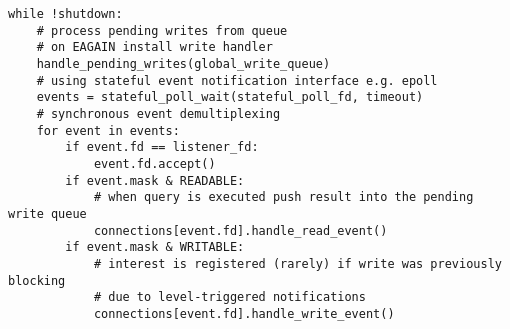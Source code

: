 \begin{lstlisting}
while !shutdown:
    # process pending writes from queue
    # on EAGAIN install write handler
    handle_pending_writes(global_write_queue)
    # using stateful event notification interface e.g. epoll
    events = stateful_poll_wait(stateful_poll_fd, timeout)
    # synchronous event demultiplexing
    for event in events:
        if event.fd == listener_fd:
            event.fd.accept()
        if event.mask & READABLE:
            # when query is executed push result into the pending write queue
            connections[event.fd].handle_read_event()
        if event.mask & WRITABLE:
            # interest is registered (rarely) if write was previously blocking
            # due to level-triggered notifications
            connections[event.fd].handle_write_event()
\end{lstlisting}